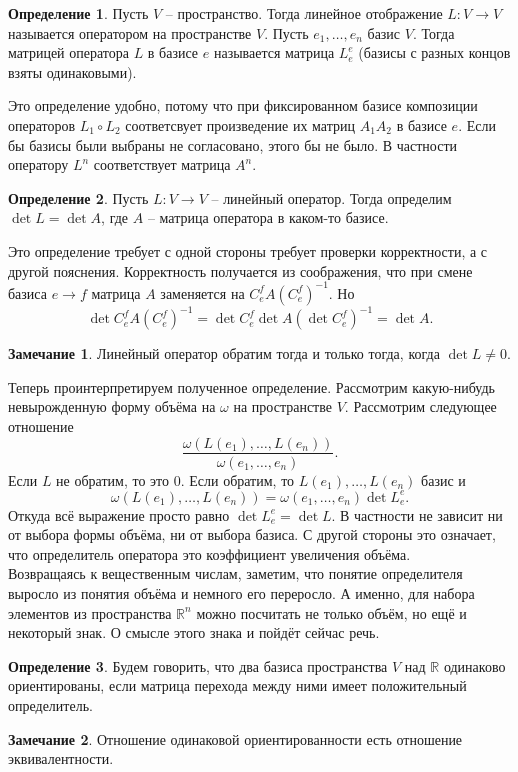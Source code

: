 \documentclass[10pt,a4paper,oneside]{book} %
\theoremstyle{definition}
\newtheorem*{rem}{Замечание}
\newtheorem*{defn}{Определение}
\newcommand{\mb}[1]{\mathbb{#1}}
\def\dfn{\begin{defn}}
\def\edfn{\end{defn}}
\def\rm{\begin{rem}}
\def\erm{\end{rem}}
\begin{document}
\dfn Пусть $V$ -- пространство. Тогда линейное отображение $L\colon V \to V$ называется оператором на пространстве $V$. Пусть $e_1,\dots, e_n$ базис $V$. Тогда матрицей оператора $L$ в базисе $e$ называется матрица $L_e^e$ (базисы с разных концов взяты одинаковыми).
\edfn

Это определение удобно, потому что при фиксированном базисе композиции операторов $L_1\circ L_2$ соответсвует произведение их матриц $A_1A_2$ в базисе $e$. Если бы базисы были выбраны не согласовано, этого бы не было. В частности оператору $L^n$ соответствует матрица $A^n$. 

\dfn Пусть $L\colon V \to V$ -- линейный оператор. Тогда определим $\det L=\det A$, где $A$ -- матрица оператора в каком-то базисе.
\edfn

Это определение требует с одной стороны требует проверки корректности, а с другой пояснения. Корректность получается из соображения, что при смене базиса $e\to f$ матрица $A$ заменяется на $C_e^fA (C_e^f)^{-1}$. Но
$$\det C_e^fA (C_e^f)^{-1}= \det C_e^f \det A (\det C_e^f)^{-1}= \det A.$$

\rm Линейный оператор обратим тогда и только тогда, когда $\det L \neq 0$.
\erm

Теперь проинтерпретируем полученное определение. Рассмотрим какую-нибудь невырожденную форму объёма на $\omega$ на пространстве $V$. Рассмотрим следующее отношение
$$\frac{\omega(L(e_1),\dots,L(e_n))}{\omega(e_1,\dots,e_n)}.$$
Если $L$ не обратим, то это 0. Если обратим, то $L(e_1),\dots,L(e_n)$ базис и $$\omega(L(e_1),\dots,L(e_n))=\omega(e_1,\dots,e_n) \det L_e^e.$$
Откуда всё выражение просто равно $\det L_e^e=\det L$. В частности не зависит ни от выбора формы объёма, ни от выбора базиса. 
С другой стороны это означает, что определитель оператора это коэффициент увеличения объёма.\\



Возвращаясь к вещественным числам, заметим, что понятие определителя выросло из понятия объёма и немного его переросло. А именно, для набора элементов из пространства $\mb R^n$ можно посчитать не только объём, но ещё и некоторый знак. О смысле этого знака и пойдёт сейчас речь. 

\dfn  Будем говорить, что два базиса пространства $V$ над $\mb R$ одинаково ориентированы, если матрица перехода между ними имеет положительный определитель.
\edfn

\rm Отношение одинаковой ориентированности есть отношение эквивалентности.
\erm
\end{document}
